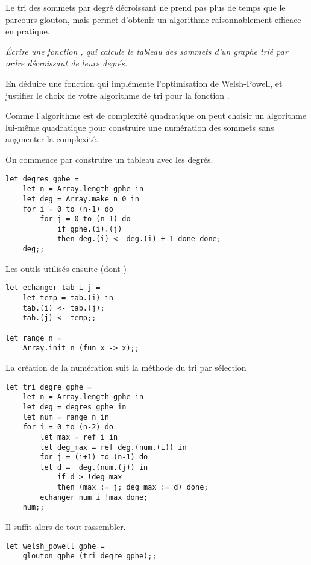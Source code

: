 Le tri des sommets par degré décroissant ne prend pas plus de temps que le parcours glouton, mais permet d'obtenir un algorithme raisonnablement efficace en pratique.
\begin{Exercise} \it 
Écrire une fonction , qui calcule le tableau des sommets d'un graphe trié par ordre décroissant de leurs degrés. 

En déduire une fonction  qui implémente l'optimisation de Welsh-Powell, et justifier le choix de votre algorithme de tri pour la fonction . 
\end{Exercise} 
\begin{Answer}

Comme l'algorithme  est de complexité quadratique on peut choisir un algorithme lui-même quadratique pour construire une numération des sommets sans augmenter la complexité.

On commence par construire un tableau avec les degrés.
\begin{lstlisting}
let degres gphe =
    let n = Array.length gphe in
    let deg = Array.make n 0 in
    for i = 0 to (n-1) do 
        for j = 0 to (n-1) do
            if gphe.(i).(j) 
            then deg.(i) <- deg.(i) + 1 done done;
    deg;;           
\end{lstlisting}

Les outils utilisés ensuite (dont )

\begin{lstlisting}
let echanger tab i j =
    let temp = tab.(i) in
    tab.(i) <- tab.(j);
    tab.(j) <- temp;;
    
let range n = 
    Array.init n (fun x -> x);;        
\end{lstlisting}

La création de la numération suit la méthode du tri par sélection
\begin{lstlisting}
let tri_degre gphe =
    let n = Array.length gphe in
    let deg = degres gphe in
    let num = range n in
    for i = 0 to (n-2) do
        let max = ref i in
        let deg_max = ref deg.(num.(i)) in
        for j = (i+1) to (n-1) do
        let d =  deg.(num.(j)) in
            if d > !deg_max
            then (max := j; deg_max := d) done;
        echanger num i !max done;
    num;;
\end{lstlisting}

Il suffit alors de tout rassembler.
\begin{lstlisting}
let welsh_powell gphe =
    glouton gphe (tri_degre gphe);;
\end{lstlisting}
\newpage
\end{Answer}
